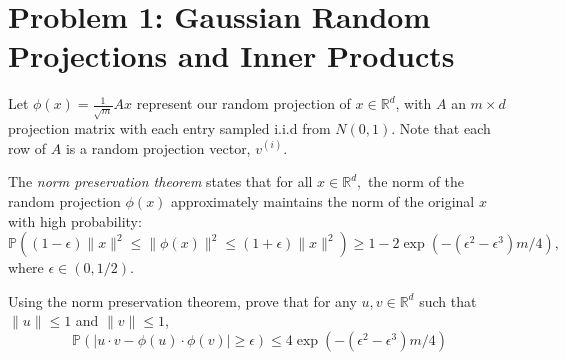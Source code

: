 \section*{Problem 1: Gaussian Random Projections and Inner Products}

Let $\phi(x) = \frac{1}{\sqrt{m}}Ax$ represent our random projection of
$x \in \mathbb{R}^d$, with $A$ an $m \times d$ projection matrix with each entry
sampled i.i.d from $N\left(0,1\right)$. Note that each row of $A$ is a random
projection vector, $v^{(i)}$.

The \emph{norm preservation theorem} states that for all $x \in \mathbb{R}^d,$
the norm of the random projection $\phi\left(x\right)$ approximately maintains
the norm of the original $x$ with high probability:
\begin{equation}
  \mathbb{P}\left(
    (1 - \epsilon) \lVert x \rVert^2
    \leq
    \lVert \phi\left(x\right) \rVert^2
    \leq
    \left(1 + \epsilon\right) \lVert x \rVert^2
  \right)  
  \geq 1 - 2\exp\left(-\left(\epsilon^2 - \epsilon^3\right)m/4\right),
  \label{eqn:1thm}
\end{equation}
where $\epsilon \in \left(0,1/2\right).$

Using the norm preservation theorem, prove that for any $u, v \in \mathbb{R}^d$
such that $\lVert u \rVert \leq 1$ and $\lVert v \rVert \leq 1$,
\begin{equation}
  \mathbb{P}\left(\lvert u \cdot v - \phi\left(u\right)\cdot\phi\left(v\right)\rvert \geq \epsilon\right) \leq 4\exp\left(
    -\left(\epsilon^2 - \epsilon^3\right)m/4
  \right)
  \label{eqn:1}
\end{equation}

